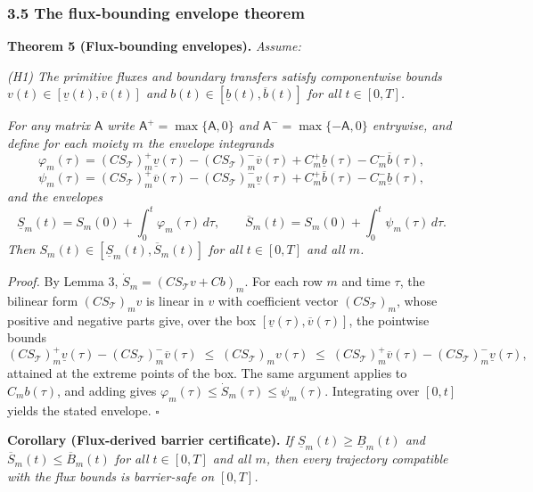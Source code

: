\documentclass[11pt]{article}
\begin{document}
\subsubsection{3.5 The flux-bounding envelope
theorem}\label{the-flux-bounding-envelope-theorem}

\textbf{Theorem 5 (Flux-bounding envelopes).} \emph{Assume:}

\emph{(H1) The primitive fluxes and boundary transfers satisfy
componentwise bounds \(v(t) \in [\underline{v}(t), \overline{v}(t)]\)
and \(b(t) \in [\underline{b}(t), \overline{b}(t)]\) for all
\(t \in [0,T]\).}

\emph{For any matrix \(\mathsf{A}\) write
\(\mathsf{A}^{+} = \max\{\mathsf{A}, 0\}\) and
\(\mathsf{A}^{-} = \max\{-\mathsf{A}, 0\}\) entrywise, and define for
each moiety \(m\) the envelope integrands}
\[\varphi_m(\tau) = (C S_{\mathcal{T}})_{m}^{+} \underline{v}(\tau) - (C S_{\mathcal{T}})_{m}^{-} \overline{v}(\tau) + C_{m}^{+} \underline{b}(\tau) - C_{m}^{-} \overline{b}(\tau),\]
\[\psi_m(\tau) = (C S_{\mathcal{T}})_{m}^{+} \overline{v}(\tau) - (C S_{\mathcal{T}})_{m}^{-} \underline{v}(\tau) + C_{m}^{+} \overline{b}(\tau) - C_{m}^{-} \underline{b}(\tau),\]
\emph{and the envelopes}
\[\underline{S}_m(t) = S_m(0) + \int_0^t \varphi_m(\tau)\, d\tau, \qquad \overline{S}_m(t) = S_m(0) + \int_0^t \psi_m(\tau)\, d\tau.\]
\emph{Then \(S_m(t) \in [\underline{S}_m(t), \overline{S}_m(t)]\) for
all \(t \in [0,T]\) and all \(m\).}

\emph{Proof.} By Lemma 3, \(\dot S_m = (C S_{\mathcal{T}} v + Cb)_m\). For each row \(m\) and time \(\tau\), the bilinear form \((C S_{\mathcal{T}})_m v\) is linear in \(v\) with coefficient vector \((C S_{\mathcal{T}})_m\), whose positive and negative parts give, over the box \([\underline{v}(\tau), \overline{v}(\tau)]\), the pointwise bounds \[(C S_{\mathcal{T}})_{m}^{+} \underline{v}(\tau) - (C S_{\mathcal{T}})_{m}^{-} \overline{v}(\tau) \;\le\; (C S_{\mathcal{T}})_m v(\tau) \;\le\; (C S_{\mathcal{T}})_{m}^{+} \overline{v}(\tau) - (C S_{\mathcal{T}})_{m}^{-} \underline{v}(\tau),\] attained at the extreme points of the box. The same argument applies to \(C_m b(\tau)\), and adding gives \(\varphi_m(\tau) \le \dot S_m(\tau) \le \psi_m(\tau)\). Integrating over \([0,t]\) yields the stated envelope. \ensuremath{\square}

\textbf{Corollary (Flux-derived barrier certificate).} \emph{If
\(\underline{S}_m(t) \ge \underline{B}_m(t)\) and
\(\overline{S}_m(t) \le \overline{B}_m(t)\) for all \(t \in [0,T]\) and
all \(m\), then every trajectory compatible with the flux bounds is
barrier-safe on \([0,T]\).}
\end{document}
